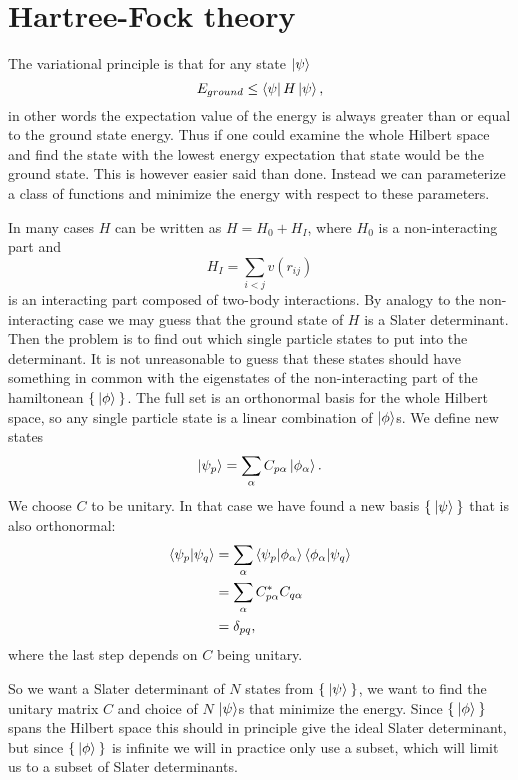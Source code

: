 \documentclass[a4paper,english,12pt]{article}
\newcommand{\be}{\begin{equation}}
\newcommand{\ee}{\end{equation}}
\begin{document}
\section{Hartree-Fock theory}


The variational principle is that for any state $\ket{\psi}$
\be\label{var}
E_{ground}\leq \bra{\psi}H\ket{\psi},
\ee
in other words the expectation value of the energy is always greater than or equal to the ground state energy.\cite{simen}
Thus if one could examine the whole Hilbert space and find the state with the lowest energy expectation that state would be the ground state.
This is however easier said than done. Instead we can parameterize a class of functions and minimize the energy with respect to these parameters.

In many cases $H$ can be written as $H = H_0 + H_I$, where $H_0$ is a non-interacting part and
\[H_I =\sum_{i<j}v(r_{ij})\]
is an interacting part composed of two-body interactions.
By analogy to the non-interacting case we may guess that the ground state of $H$ is a Slater determinant. Then the problem is to find out which
single particle states to put into the determinant. It is not unreasonable to guess that these states should have something in common with
the eigenstates of the non-interacting part of the hamiltonean \(\Set{\Ket{\phi}}\). The full set is an orthonormal basis for the whole Hilbert space,
so any single particle state is a linear combination of $\ket{\phi}$s. We define new states
\be  \ket{\psi_p} = \sum_\alpha C_{p\alpha}\ket{\phi_\alpha}.\ee
We choose $C$ to be unitary. In that case we have found a new basis \(\Set{\Ket{\psi}}\) that is also orthonormal:
\begin{align*}
  \braket{\psi_p|\psi_q} &= \sum_\alpha\braket{\psi_p|\phi_\alpha}\braket{\phi_\alpha|\psi_q}\\
  &=\sum_{\alpha}C_{p\alpha}^*C_{q\alpha}\\
  &=\delta_{pq},
\end{align*}  
where the last step depends on $C$ being unitary.

So we want a Slater determinant of $N$ states from \(\Set{\Ket{\psi}}\), we want to find the unitary matrix $C$ and choice of $N$ $\ket{\psi}$s that minimize the
energy. Since \(\Set{\Ket{\phi}}\) spans the Hilbert space this should in principle give the ideal Slater determinant, but since \(\Set{\Ket{\phi}}\)
is infinite we will in practice only use a subset, which will limit us to a subset of Slater determinants.
\end{document}
